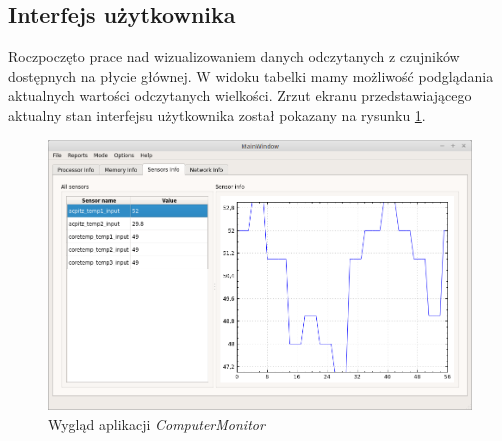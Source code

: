 \documentclass[a4paper]{article}
\begin{document}
\subsection{Interfejs użytkownika}
Roczpoczęto prace nad wizualizowaniem danych  odczytanych z czujników dostępnych na płycie głównej.
W widoku tabelki mamy możliwość podglądania aktualnych wartości odczytanych wielkości. Zrzut ekranu przedstawiającego aktualny stan interfejsu użytkownika został pokazany na rysunku \ref{wygladAplikacji}.

\begin{figure}[h]
	\centering
	\includegraphics[width=\linewidth]{img/wygladAplikacji.png}
	\caption{Wygląd aplikacji \textit{ComputerMonitor}}
	\label{wygladAplikacji}
\end{figure}
\end{document}
